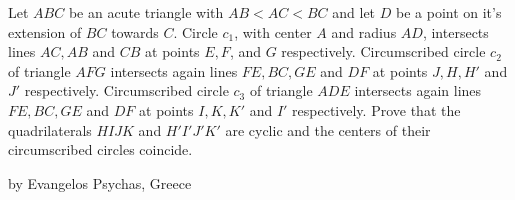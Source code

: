 Let $ABC$ be an acute triangle with $AB<AC<BC$  and let $D$ be a point on it's extension of $BC$ towards $C$. Circle $c_1$,  with center $A$ and radius $AD$,  intersects lines $AC,AB$ and $CB$ at points $E,F$,  and $G$ respectively. Circumscribed circle $c_2$ of triangle $AFG$ intersects again lines $FE,BC,GE$ and $DF$ at points $J,H,H' $ and $J'$  respectively. Circumscribed circle $c_3$ of triangle $ADE$ intersects again lines $FE,BC,GE$ and $DF$ at points $I,K,K' $ and $I' $  respectively. Prove that the quadrilaterals $HIJK$ and $H'I'J'K '$ are cyclic and the centers of their circumscribed circles coincide.

by Evangelos Psychas, Greece